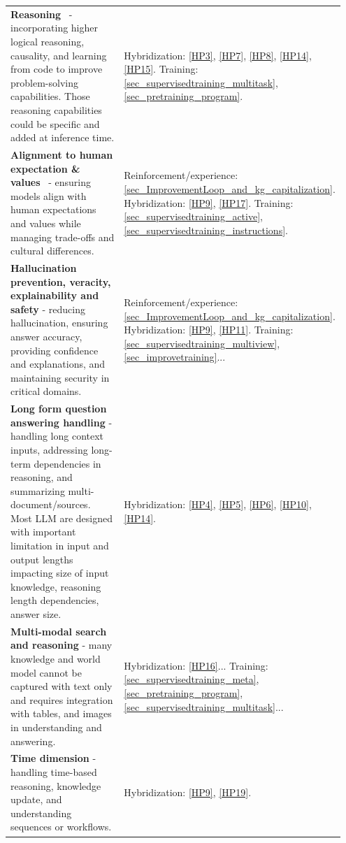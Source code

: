 \documentclass[acmsmall]{acmart}
\begin{document}
{\begin{longtable}{p{0.7\linewidth} >{\tiny}p{0.25\linewidth}}
\textbf{Reasoning}~\citep{rogersQADatasetExplosion2022} - incorporating higher logical reasoning, causality, and learning from code to improve problem-solving capabilities. Those reasoning capabilities could be specific and added at inference time.
&
    Hybridization: \ref{HP3}, \ref{HP7}, \ref{HP8}, \ref{HP14}, \ref{HP15}.
    Training: \ref{sec_supervisedtraining_multitask}, \ref{sec_pretraining_program}.
\\

\textbf{Alignment to human expectation \& values}~\citep{baiTrainingHelpfulHarmless2022} - ensuring models align with human expectations and values while managing trade-offs and cultural differences.
&
    Reinforcement/experience: \ref{sec_ImprovementLoop_and_kg_capitalization}.
    Hybridization: \ref{HP9}, \ref{HP17}.
    Training: \ref{sec_supervisedtraining_active}, \ref{sec_supervisedtraining_instructions}.
\\

\textbf{Hallucination~\citep{jiSurveyHallucinationNatural2022} prevention, veracity, explainability and safety} - reducing hallucination, ensuring answer accuracy, providing confidence and explanations, and maintaining security in critical domains.
&
    Reinforcement/experience: \ref{sec_ImprovementLoop_and_kg_capitalization}.
    Hybridization: \ref{HP9}, \ref{HP11}.
    Training: \ref{sec_supervisedtraining_multiview}, \ref{sec_improvetraining}...
\\

\textbf{Long form question answering handling} - handling long context inputs, addressing long-term dependencies in reasoning, and summarizing multi-document/sources. Most LLM are designed with important limitation in input and output lengths impacting size of input knowledge, reasoning length dependencies, answer size.
&
    Hybridization: \ref{HP4}, \ref{HP5}, \ref{HP6}, \ref{HP10}, \ref{HP14}.
\\

\textbf{Multi-modal search and reasoning} - many knowledge and world model cannot be captured with text only and requires integration with tables, and images in understanding and answering.
&
    Hybridization: \ref{HP16}...
    Training: \ref{sec_supervisedtraining_meta}, \ref{sec_pretraining_program}, \ref{sec_supervisedtraining_multitask}...
\\

\textbf{Time dimension} - handling time-based reasoning, knowledge update, and understanding sequences or workflows.
&
    Hybridization: \ref{HP9}, \ref{HP19}.
\\


\end{longtable}}
\end{document}

